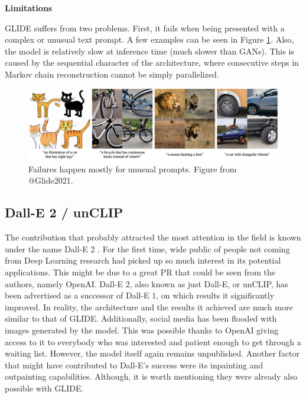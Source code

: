 \documentclass[
]{krantz}
\begin{document}
\textbf{Limitations}

GLIDE suffers from two problems. First, it fails when being presented with a complex or unusual text prompt. A few examples can be seen in Figure \ref{fig:glidefails}. Also, the model is relatively slow at inference time (much slower than GANs). This is caused by the sequential character of the architecture, where consecutive steps in Markov chain reconstruction cannot be simply parallelized.

\begin{figure}

{\centering \includegraphics[width=1\linewidth]{figures/02-02-text-2-img/glidefails} 

}

\caption{Failures happen mostly for unusual prompts. Figure from @Glide2021.}\label{fig:glidefails}
\end{figure}

\hypertarget{dall-e-2-unclip}{%
\subsection{Dall-E 2 / unCLIP}\label{dall-e-2-unclip}}

The contribution that probably attracted the most attention in the field is known under the name Dall-E 2 \citep{DALLE2}. For the first time, wide public of people not coming from Deep Learning research had picked up so much interest in its potential applications. This might be due to a great PR that could be seen from the authors, namely OpenAI. Dall-E 2, also known as just Dall-E, or unCLIP, has been advertised as a successor of Dall-E 1, on which results it significantly improved. In reality, the architecture and the results it achieved are much more similar to that of GLIDE. Additionally, social media has been flooded with images generated by the model. This was possible thanks to OpenAI giving access to it to everybody who was interested and patient enough to get through a waiting list. However, the model itself again remains unpublished. Another factor that might have contributed to Dall-E's success were its inpainting and outpainting capabilities. Although, it is worth mentioning they were already also possible with GLIDE.
\end{document}

